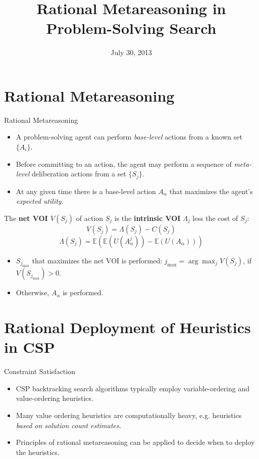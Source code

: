 \documentclass{beamer}
\title{Rational Metareasoning in Problem-Solving Search}
\date{July 30, 2013}
\begin{document}
\begin{frame}
\titlepage
\end{frame}

\begin{frame}
\tableofcontents
\end{frame}

\section{Rational Metareasoning}

\begin{frame}{Rational Metareasoning}
\begin{itemize}
\item A problem-solving agent can perform {\it base-level} actions from a known
          set $\{A_i\}$.
\item Before committing to an action, the agent may perform a sequence of
          {\it meta-level} deliberation actions from a set $\{S_j\}$.
\item At any given time there is a base-level action $A_\alpha$ that maximizes
          the agent's {\it expected utility.}
\end{itemize}

          The {\bf net VOI $V(S_j)$} of action $S_j$ is the {\bf intrinsic VOI} $\Lambda_j$ less the cost of $S_j$:
          \[V(S_j)=\Lambda(S_j)-C(S_j)\]
           \[\Lambda(S_j)=\mathbb{E}\left(\mathbb{E}(U(A_\alpha^j))-\mathbb{E}(U(A_\alpha))\right)\]

\begin{itemize} 
\item  $S_{j_{\max}}$ that maximizes the net VOI  is performed: $j_{\max} = \arg\max_jV(S_j)$, if $V(S_{j_{\max}})>0$.
\item Otherwise, $A_\alpha$ is performed.
\end{itemize}
\end{frame}


\section{Rational Deployment of Heuristics in CSP}

\begin{frame}{Constraint Satisfaction}
\begin{itemize}
\item CSP backtracking search algorithms typically employ
  variable-ordering and value-ordering heuristics.
\item Many value ordering heuristics are computationally
  heavy, e.g. heuristics {\it based on solution count
          estimates.}
\item Principles of rational metareasoning can be applied
          to decide when to deploy the heuristics.
\end{itemize}
\end{frame}
\end{document}

